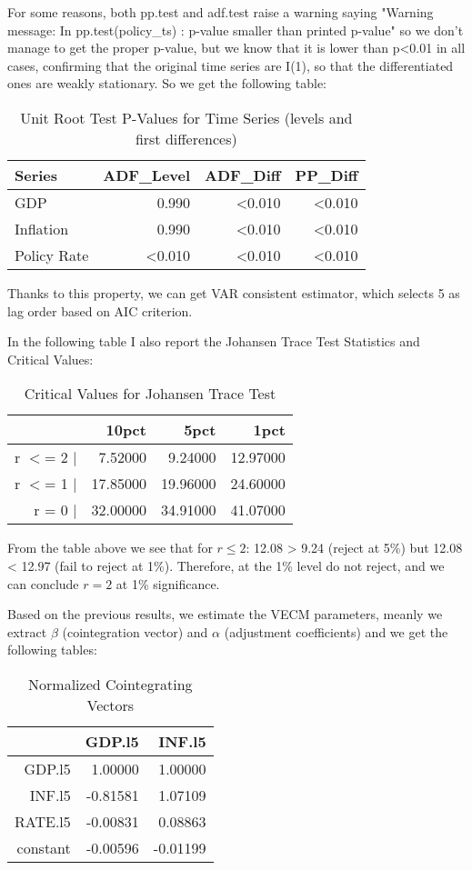 \documentclass[a4paper,12pt]{article}
\theoremstyle{remark}
\begin{document}
For some reasons, both pp.test and adf.test raise a warning saying "Warning message: In pp.test(policy\_ts) : p-value smaller than printed p-value" so we don't manage to get the proper p-value, but we know that it is lower than p<0.01 in all cases, confirming that the original time series are I(1), so that the differentiated ones are weakly stationary. So we get the following table:
\begin{table}[ht]
\centering
\begin{tabular}{lrrr}
  \hline
Series & ADF\_Level & ADF\_Diff & PP\_Diff \\ 
  \hline
GDP & 0.990 & <0.010 & <0.010 \\ 
  Inflation & 0.990 & <0.010 & <0.010 \\ 
  Policy Rate & <0.010 & <0.010 & <0.010 \\ 
   \hline
\end{tabular}
\caption{Unit Root Test P-Values for Time Series (levels and first differences)} 
\label{tab:unit_root}
\end{table}
Thanks to this property, we can get VAR consistent estimator, which selects 5 as lag order based on AIC criterion.

In the following table I also report the Johansen Trace Test Statistics and Critical Values:
\begin{table}[H]
\centering
\begin{tabular}{rrrr}
  \hline
 & 10pct & 5pct & 1pct \\ 
  \hline
  r $<$= 2 $|$ & 7.52000 & 9.24000 & 12.97000 \\ 
  r $<$= 1 $|$ & 17.85000 & 19.96000 & 24.60000 \\ 
  r = 0  $|$ & 32.00000 & 34.91000 & 41.07000 \\ 
   \hline
\end{tabular}
\caption{Critical Values for Johansen Trace Test} 
\label{tab:cval}
\end{table}

From the table above we see that for \(r\le2\): 12.08 > 9.24 (reject at 5\%) but 12.08 < 12.97 (fail to reject at 1\%). Therefore, at the 1\% level do not reject, and we can conclude \(r=2\) at 1\% significance.

Based on the previous results, we estimate the VECM parameters, meanly we extract $\beta$ (cointegration vector) and $\alpha$ (adjustment coefficients) and we get the following tables:
\begin{table}[H]
\centering
\begin{tabular}{rrr}
  \hline
 & GDP.l5 & INF.l5 \\ 
  \hline
GDP.l5 & 1.00000 & 1.00000 \\ 
  INF.l5 & -0.81581 & 1.07109 \\ 
  RATE.l5 & -0.00831 & 0.08863 \\ 
  constant & -0.00596 & -0.01199 \\ 
   \hline
\end{tabular}
\caption{Normalized Cointegrating Vectors} 
\label{tab:beta_norm}
\end{table}
\end{document}
